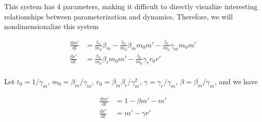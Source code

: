 \documentclass{ucetd}
\begin{document}
\begin{appendices}
This system has 4 parameters, making it difficult to directly visualize interesting relationships between parameterization and dynamics. Therefore, we will nondimensionalize this system

\begin{align}
\frac{\mathrm{d}m'}{\mathrm{d}t} &= \frac{t_0}{m_0}\beta_{m} - \frac{t_0}{m_0}\beta_{m}m_{0}m' - \frac{t_0}{m_0}\gamma_m m_{0}m'\\
\frac{\mathrm{d}r'}{\mathrm{d}t} &= \frac{t_0}{m_0}\beta_{r} m_{0}m' - \frac{t_0}{m_0}\gamma_r r_{0}r'\\
\end{align}

Let $t_{0} = 1/\gamma_{m}$, $m_{0} = \beta_{m}/\gamma_{m}$, $r_{0} = \beta_{m}\beta_{r}/\gamma_{m}^{2}$, $\gamma = \gamma_{r}/\gamma_{m}$, $\beta = \beta_{m}/\gamma_{m}$, and we have

\begin{align}
\frac{\mathrm{d}m'}{\mathrm{d}t} &= 1 - \beta m' - m'\\
\frac{\mathrm{d}r'}{\mathrm{d}t} &= m' - \gamma r'\\
\end{align}





\end{appendices}
\end{document}
